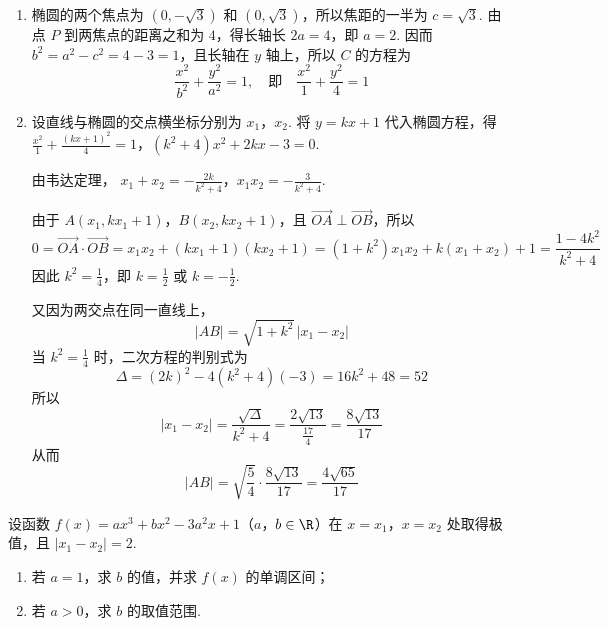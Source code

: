 \begin{solution}
\begin{enumerate}
\item 椭圆的两个焦点为 \((0,-\sqrt{3})\) 和 \((0,\sqrt{3})\)，所以焦距的一半为 \(c=\sqrt{3}\). 由点 \(P\) 到两焦点的距离之和为 \(4\)，得长轴长 \(2a=4\)，即 \(a=2\). 因而 \(b^2=a^2-c^2=4-3=1\)，且长轴在 \(y\) 轴上，所以 \(C\) 的方程为
\[
\frac{x^2}{b^2}+\frac{y^2}{a^2}=1,
\quad\text{即}\quad
\frac{x^2}{1}+\frac{y^2}{4}=1
\]

\item 设直线与椭圆的交点横坐标分别为 \(x_1\)，\(x_2\). 将 \(y=kx+1\) 代入椭圆方程，得
\(\frac{x^2}{1}+\frac{(kx+1)^2}{4}=1\)，\((k^2+4)x^2+2kx-3=0\).

由韦达定理，
\(x_1+x_2=-\frac{2k}{k^2+4}\)，\(x_1x_2=-\frac{3}{k^2+4}\).

由于 \(A(x_1,kx_1+1)\)，\(B(x_2,kx_2+1)\)，且 \(\overrightarrow{OA}\perp\overrightarrow{OB}\)，所以
\[
0=\overrightarrow{OA}\cdot\overrightarrow{OB}=x_1x_2+(kx_1+1)(kx_2+1)
 = (1+k^2)x_1x_2+k(x_1+x_2)+1
 =\frac{1-4k^2}{k^2+4}
\]
因此 \(k^2=\frac{1}{4}\)，即 \(k=\frac{1}{2}\) 或 \(k=-\frac{1}{2}\).

又因为两交点在同一直线上，
\[
\lvert AB\rvert=\sqrt{1+k^2}\,\lvert x_1-x_2\rvert
\]
当 \(k^2=\frac{1}{4}\) 时，二次方程的判别式为
\[
\Delta=(2k)^2-4(k^2+4)(-3)=16k^2+48=52
\]
所以
\[
\lvert x_1-x_2\rvert=\frac{\sqrt{\Delta}}{k^2+4}
=\frac{2\sqrt{13}}{\frac{17}{4}}
=\frac{8\sqrt{13}}{17}
\]
从而
\[
\lvert AB\rvert=\sqrt{\frac{5}{4}}\cdot\frac{8\sqrt{13}}{17}
=\frac{4\sqrt{65}}{17}
\]
\end{enumerate}
\end{solution}

\begin{problem}
设函数 \( f(x) = ax^3 + bx^2 - 3a^2x + 1 \)（\(a\)，\(b \in \R\)）在 \(x = x_1\)，\(x = x_2\) 处取得极值，且 \(\lvert x_1 - x_2\rvert = 2\).

\begin{enumerate}
\item 若 \(a = 1\)，求 \(b\) 的值，并求 \(f(x)\) 的单调区间；
\item 若 \(a > 0\)，求 \(b\) 的取值范围.
\end{enumerate}
\end{problem}

